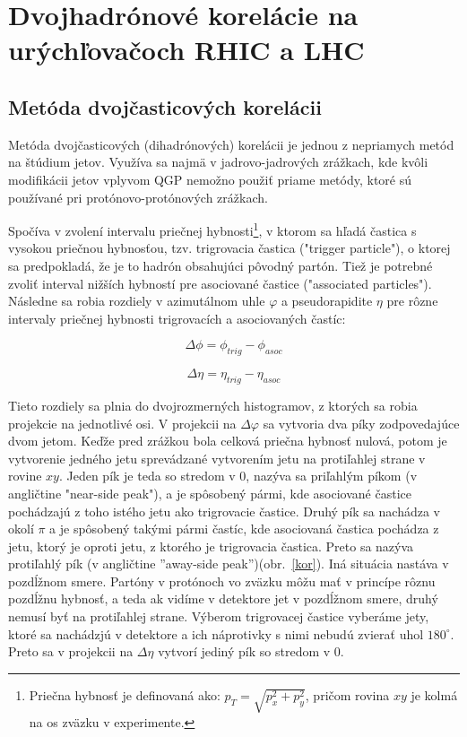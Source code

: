 \documentclass[thesismargins, thesislinespacing]{rnthesis}
\begin{document}
\chapter{Dvojhadrónové korelácie na urýchľovačoch RHIC a LHC}

\section{Metóda dvojčasticových korelácii}
Metóda dvojčasticových (dihadrónových) korelácii je jednou z nepriamych metód na štúdium jetov. Využíva sa najmä v jadrovo-jadrových zrážkach, kde kvôli \-mo\-di\-fi\-ká\-cii jetov vplyvom QGP nemožno použiť priame metódy, ktoré sú používané pri protónovo-protónových zrážkach.

Spočíva v zvolení intervalu priečnej hybnosti\footnote{Priečna hybnosť je definovaná ako: $p_T=\sqrt{p_x^2+p_y^2}$, pričom rovina $xy$ je kolmá na os zväzku v experimente.}, v ktorom sa hľadá častica s vysokou priečnou hybnosťou, tzv. trigrovacia častica ("trigger particle"), o ktorej sa predpokladá, že je to hadrón obsahujúci pôvodný partón. Tiež je potrebné zvoliť interval nižších hybností pre asociované častice ("\-associated particles"). Následne sa robia rozdiely v \-a\-zi\-mu\-tál\-nom uhle $\varphi$ a pseudorapidite $\eta$ pre rôzne intervaly priečnej hybnosti trigrovacích a asociovaných častíc:

\begin{equation}
\Delta \phi = \phi_{trig} - \phi_{asoc}
\end{equation}

\begin{equation}
\Delta \eta = \eta_{trig} - \eta_{asoc}
\end{equation}

Tieto rozdiely sa plnia do dvojrozmerných histogramov, z ktorých sa robia projekcie na jednotlivé osi. V projekcii na $\Delta \varphi$ sa vytvoria dva píky zodpovedajúce dvom jetom. Keďže pred zrážkou bola celková priečna hybnosť nulová, potom je vytvorenie jedného jetu sprevádzané vytvorením jetu na protiľahlej strane v rovine $xy$. Jeden pík je teda so stredom v 0, nazýva sa priľahlým píkom (v angličtine "near-side peak"), a je spôsobený pármi, kde asociované častice pochádzajú z toho istého jetu ako trigrovacie častice. Druhý pík sa nachádza v okolí $\pi$ a je spôsobený takými pármi častíc, kde asociovaná častica pochádza z jetu, ktorý je oproti jetu, z ktorého je trigrovacia častica. Preto sa nazýva protiľahlý pík (v angličtine ''away-side peak'')(obr.~\ref{kor}). Iná situácia nastáva v pozdĺžnom smere. Partóny v protónoch vo zväzku môžu mať v princípe rôznu pozdĺžnu hybnosť, a teda ak vidíme v detektore jet v pozdĺžnom smere, druhý nemusí byť na protiľahlej strane. Výberom trigrovacej častice vyberáme jety, ktoré sa nachádzjú v detektore a ich náprotivky s nimi nebudú zvierať uhol $180^\circ$. Preto sa v projekcii na $\Delta \eta$ vytvorí jediný pík so stredom v 0.
\end{document}
